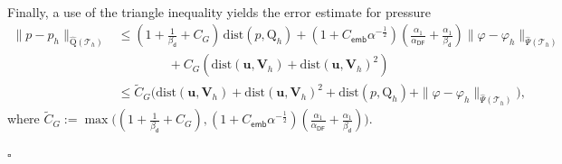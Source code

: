 \documentclass[11pt, reqno, a4paper, twoside]{article}
\newcommand{\bu}{\boldsymbol{u}}
\newcommand{\rQ}{\mathrm{Q}}
\newcommand{\bV}{\mathbf{V}}
\newcommand{\cT}{\mathcal{T}}
\newenvironment{proof}{\noindent{\it Proof.}}{\hfill$\square$}
\numberwithin{equation}{section}
\numberwithin{remark}{section}
\numberwithin{figure}{section}
\numberwithin{table}{section}
\newcommand{\rrb}[1]{{\leavevmode\color{lightgreen}{#1}}}
\begin{document}
{\begin{proof}
{\begin{align*}
    \end{align*}
    Finally, a use of the triangle inequality yields the error estimate for pressure 
\begin{align}\label{eq:error.est.p-ph}
        \|p-p_h\|_{\widehat{\rQ}(\cT_h)}&\leq(1+\frac1{\beta_{\mathsf{d}}}+C_G)\,\mathrm{dist}(p,\rQ_h)+(1+C_{\mathsf{emb}}\alpha^{-\frac12})(\frac{\alpha_1}{\alpha_{\mathsf{DF}}}+\frac{\alpha_1}{\beta_{\mathsf{d}}})\|\varphi-\varphi_h\|_{\widehat{\Psi}(\cT_h)}\nonumber\\&\qquad\qquad+C_G(\mathrm{dist}(\bu,\bV_h)+\mathrm{dist}(\bu,\bV_h)^2)\nonumber\\
        &\leq \tilde C_G \bigl(\mathrm{dist}(\bu,\bV_h)+\mathrm{dist}(\bu,\bV_h)^2+\mathrm{dist}(p,\rQ_h)+\|\varphi-\varphi_h\|_{\widehat{\Psi}(\cT_h)}\bigr),
    \end{align}
    where {\(\tilde C_G:=\max\bigl((1+\frac1{\beta_{\mathsf{d}}}+C_G), (1+C_{\mathsf{emb}}\alpha^{-\frac12})(\frac{\alpha_1}{\alpha_{\mathsf{DF}}}+\frac{\alpha_1}{\beta_{\mathsf{d}}})
    \bigr).\)}
} 


\end{proof}}
\end{document}
